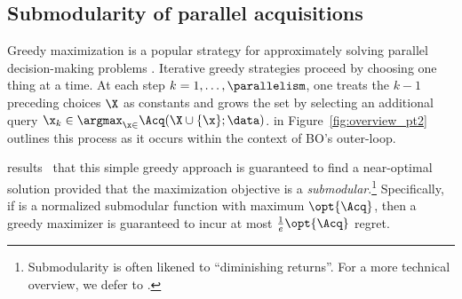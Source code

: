 
\subsection{Submodularity of parallel acquisitions}
\label{sect:submodularity}

\newcommand{\idx}{i}
\newcommand{\argdot}{\makebox[1ex]{\textbf{$\cdot$}}}



Greedy maximization is a popular strategy for approximately solving parallel decision-making problems \cite{azimi2010batch,chen2013near,contal2013parallel,desautels2014parallelizing,shah2015parallel,kathuria2016batched}. Iterative greedy strategies proceed by choosing one thing at a time. At each step \(k = 1,\dotsc, \parallelism\), one treats the \(k{-}1\) preceding choices \(\X\) as constants and grows the set by selecting an additional query \(\x_{k} \in \argmax_{\x \in \xspace} \Acq(\X \cup \{\x\}; \data)\).  in Figure~\ref{fig:overview_pt2} outlines this process as it occurs within the context of BO's outer-loop.

 results~\cite{minoux1978accelerated,nemhauser78,krause14}  that this simple greedy approach is guaranteed to find a near-optimal solution provided that the maximization objective is a \emph{submodular}.\footnote{Submodularity is often likened to ``diminishing returns''. For a more technical overview, we defer to \cite{bach2013learning}.} Specifically, if \Acq{} is a normalized submodular function with maximum \(\opt{\Acq}\), then a greedy maximizer is guaranteed to incur at most \(\tfrac{1}{e}\opt{\Acq}\) regret.


